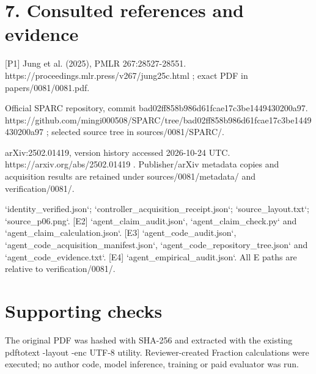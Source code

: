 \documentclass[10pt]{article}
\begin{document}
\section*{7. Consulted references and evidence}
[P1] Jung et al. (2025), PMLR 267:28527-28551. https://proceedings.mlr.press/v267/jung25c.html ; exact PDF in papers/0081/0081.pdf.\par
[P2] Official SPARC repository, commit bad02ff858b986d61fcae17c3be1449430200a97. https://github.com/mingi000508/SPARC/tree/bad02ff858b986d61fcae17c3be1449430200a97 ; selected source tree in sources/0081/SPARC/.\par
[P3] arXiv:2502.01419, version history accessed 2026-10-24 UTC. https://arxiv.org/abs/2502.01419 . Publisher/arXiv metadata copies and acquisition results are retained under sources/0081/metadata/ and verification/0081/.\par
[E1] `identity\_verified.json`; `controller\_acquisition\_receipt.json`; `source\_layout.txt`; `source\_p06.png`. [E2] `agent\_claim\_audit.json`, `agent\_claim\_check.py` and `agent\_claim\_calculation.json`. [E3] `agent\_code\_audit.json`, `agent\_code\_acquisition\_manifest.json`, `agent\_code\_repository\_tree.json` and `agent\_code\_evidence.txt`. [E4] `agent\_empirical\_audit.json`. All E paths are relative to verification/0081/.\par
\section*{Supporting checks}
The original PDF was hashed with SHA-256 and extracted with the existing pdftotext -layout -enc UTF-8 utility. Reviewer-created Fraction calculations were executed; no author code, model inference, training or paid evaluator was run.\par
\end{document}
